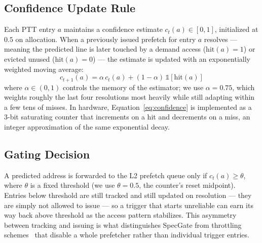 \subsection{Confidence Update Rule}
Each PTT entry $a$ maintains a confidence estimate $c_t(a) \in [0,1]$, initialized at $0.5$ on allocation. When a previously issued prefetch for entry $a$ resolves --- meaning the predicted line is later touched by a demand access ($\mathrm{hit}(a)=1$) or evicted unused ($\mathrm{hit}(a)=0$) --- the estimate is updated with an exponentially weighted moving average:
\begin{equation}
  c_{t+1}(a) = \alpha \, c_t(a) + (1-\alpha)\,\mathbb{1}[\mathrm{hit}(a)]
  \label{eq:confidence}
\end{equation}
where $\alpha \in (0,1)$ controls the memory of the estimator; we use $\alpha = 0.75$, which weights roughly the last four resolutions most heavily while still adapting within a few tens of misses. In hardware, Equation~\ref{eq:confidence} is implemented as a 3-bit saturating counter that increments on a hit and decrements on a miss, an integer approximation of the same exponential decay.

\subsection{Gating Decision}
A predicted address is forwarded to the L2 prefetch queue only if $c_t(a) \geq \theta$, where $\theta$ is a fixed threshold (we use $\theta = 0.5$, the counter's reset midpoint). Entries below threshold are still tracked and still updated on resolution --- they are simply not allowed to issue --- so a trigger that starts unreliable can earn its way back above threshold as the access pattern stabilizes. This asymmetry between tracking and issuing is what distinguishes SpecGate from throttling schemes~\cite{gem2019} that disable a whole prefetcher rather than individual trigger entries.
